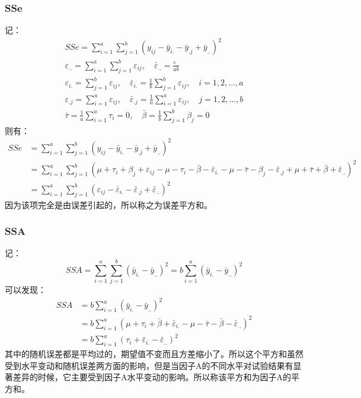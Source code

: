\subsubsection{SSe}
记：
\begin{gather*}
	SSe=\sum_{i=1}^a\sum_{j=1}^b(y_{ij}-\bar{y}_{i.}-\bar{y}_{.j}+\bar{y}_{..})^2 \\
	\varepsilon_{..}=\sum_{i=1}^a\sum_{j=1}^b\varepsilon_{ij},\quad
	\bar{\varepsilon}_{..}=\frac{\varepsilon_{..}}{ab} \\
	\varepsilon_{i.}=\sum_{j=1}^b\varepsilon_{ij},\quad
	\bar{\varepsilon}_{i.}=\frac{1}{b}\sum_{j=1}^b\varepsilon_{ij},\quad i=1,2,\dots,a \\
	\varepsilon_{.j}=\sum_{i=1}^a\varepsilon_{ij},\quad
	\bar{\varepsilon}_{.j}=\frac{1}{a}\sum_{i=1}^a\varepsilon_{ij},\quad j=1,2,\dots,b \\
	\bar{\tau}=\frac{1}{a}\sum_{i=1}^a\tau_i=0,\quad
	\bar{\beta}=\frac{1}{b}\sum_{j=1}^b\beta_j=0
\end{gather*}
则有：
\begin{align*}
	SSe
	&=\sum_{i=1}^a\sum_{j=1}^b(y_{ij}-\bar{y}_{i.}-\bar{y}_{.j}+\bar{y}_{..})^2 \\
	&=\sum_{i=1}^a\sum_{j=1}^b(\mu+\tau_i+\beta_j+\varepsilon_{ij}-\mu-\tau_i-\bar{\beta}-\bar{\varepsilon}_{i.}-\mu-\bar{\tau}-\beta_j-\bar{\varepsilon}_{.j}+\mu+\bar{\tau}+\bar{\beta}+\bar{\varepsilon}_{..})^2 \\
	&=\sum_{i=1}^a\sum_{j=1}^b(\varepsilon_{ij}-\bar{\varepsilon}_{i.}-\bar{\varepsilon}_{.j}+\bar{\varepsilon}_{..})^2
\end{align*}
因为该项完全是由误差引起的，所以称之为误差平方和。
\subsubsection{SSA}
记：
\begin{equation*}
	SSA=\sum_{i=1}^a\sum_{j=1}^b(\bar{y}_{i.}-\bar{y}_{..})^2=b\sum_{i=1}^a(\bar{y}_{i.}-\bar{y}_{..})^2
\end{equation*}
可以发现：
\begin{align*}
	SSA&=b\sum_{i=1}^a(\bar{y}_{i.}-\bar{y}_{..})^2 \\
	&=b\sum_{i=1}^a(\mu+\tau_i+\bar{\beta}+\bar{\varepsilon}_{i.}-\mu-\bar{\tau}-\bar{\beta}-\bar{\varepsilon}_{..})^2 \\
	&=b\sum_{i=1}^a(\tau_i+\bar{\varepsilon}_{i.}-\bar{\varepsilon}_{..})^2
\end{align*}
其中的随机误差都是平均过的，期望值不变而且方差缩小了。所以这个平方和虽然受到水平变动和随机误差两方面的影响，但是当因子A的不同水平对试验结果有显著差异的时候，它主要受到因子A水平变动的影响。所以称该平方和为因子A的平方和。

